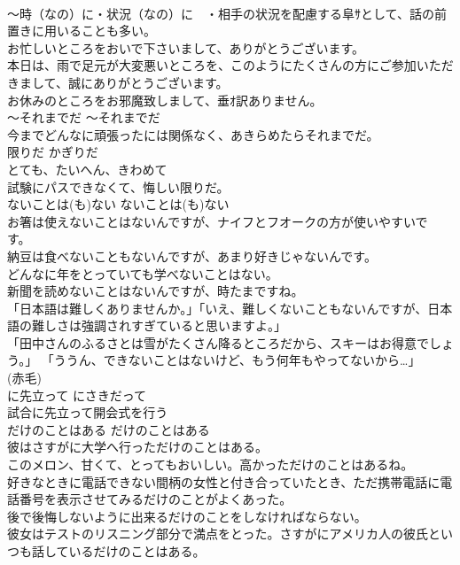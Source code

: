 \documentclass[8pt]{extreport}
\begin{document}
\begin{CJK}{UTF8}{min}
\\	〜時（なの）に・状況（なの）に　・相手の状況を配慮する阜ｻとして、話の前置きに用いることも多い。	
\\	お忙しいところをおいで下さいまして、ありがとうございます。  
\\	本日は、雨で足元が大変悪いところを、このようにたくさんの方にご参加いただきまして、誠にありがとうございます。  
\\	お休みのところをお邪魔致しまして、垂ｵ訳ありません。  
\\	〜それまでだ	〜それまでだ	
\\	今までどんなに頑張ったには関係なく、あきらめたらそれまでだ。  
\\	限りだ	かぎりだ	
\\	とても、たいへん、きわめて	
\\	試験にパスできなくて、悔しい限りだ。  
\\	ないことは(も)ない	ないことは(も)ない	
\\	お箸は使えないことはないんですが、ナイフとフオークの方が使いやすいです。  
\\	納豆は食べないこともないんですが、あまり好きじゃないんです。  
\\	どんなに年をとっていても学べないことはない。  
\\	新聞を読めないことはないんですが、時たまですね。   
\\	「日本語は難しくありませんか。」「いえ、難しくないこともないんですが、日本語の難しさは強調されすぎていると思いますよ。」  
\\	「田中さんのふるさとは雪がたくさん降るところだから、スキーはお得意でしょう。」 「ううん、できないことはないけど、もう何年もやってないから…」  
\\	(赤毛)
\\	に先立って	にさきだって	
\\	試合に先立って開会式を行う  
\\	だけのことはある	だけのことはある	
\\	彼はさすがに大学へ行っただけのことはある。   
\\	このメロン、甘くて、とってもおいしい。高かっただけのことはあるね。  
\\	好きなときに電話できない間柄の女性と付き合っていたとき、ただ携帯電話に電話番号を表示させてみるだけのことがよくあった。  
\\	後で後悔しないように出来るだけのことをしなければならない。  
\\	彼女はテストのリスニング部分で満点をとった。さすがにアメリカ人の彼氏といつも話しているだけのことはある。  

\end{CJK}
\end{document}

